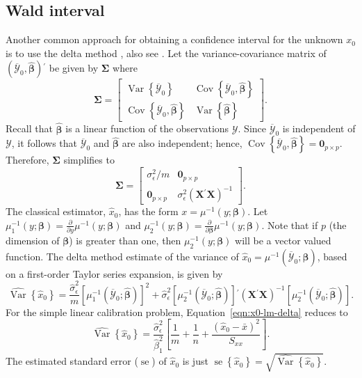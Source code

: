 \documentclass[cmfont,usenames,dvipsnames,leqno]{afit-etd}\usepackage[]{graphicx}\usepackage[]{color}
\newcommand{\trans}{\ensuremath{^\prime}}
\newcommand{\bc}[1]{\ensuremath{\bm{\mathcal{#1}}}}
\newcommand{\mc}[1]{\ensuremath{\mathcal{#1}}}
\newcommand{\wh}[1]{\ensuremath{\widehat{#1}}}
\newcommand{\wb}[1]{\ensuremath{\overline{#1}}}
\newcommand{\var}{\operatorname{Var}}
\newcommand{\cov}{\operatorname{Cov}}
\newcommand{\se}{\operatorname{se}}
\newcommand{\X}{\ensuremath{\bm{X}}}
\begin{document}
\subsection{Wald interval}
\label{sec:wald_int}
Another common approach for obtaining a confidence interval for the unknown $x_0$ is to use the delta method \citep{verhoef_who_2012, dorfman_note_1938}, also see \citet{casella_statistical_2002}. Let the variance-covariance matrix of $\left(\wb{\mc{Y}}_0, \wh{\bm{\beta}}\right)\trans$ be given by $\bm{\Sigma}$ where
\begin{equation*}
  \bm{\Sigma} = 
    \begin{bmatrix}
      \var\left\{\wb{\mc{Y}}_0\right\} & \cov\left\{\wb{\mc{Y}}_0, \wh{\bm{\beta}}\right\} \\
      \cov\left\{\wb{\mc{Y}}_0, \wh{\bm{\beta}}\right\} & \var\left\{\wh{\bm{\beta}}\right\}
    \end{bmatrix}.
\end{equation*}
Recall that $\wh{\bm{\beta}}$ is a linear function of the observations $\bc{Y}$. Since $\wb{\mc{Y}}_0$ is independent of $\bc{Y}$, it follows that $\wb{\mc{Y}}_0$ and $\wh{\bm{\beta}}$ are also independent; hence, $\cov\left\{\wb{\mc{Y}}_0, \wh{\bm{\beta}}\right\} = \bm{0}_{p \times p}$. Therefore, $\bm{\Sigma}$ simplifies to
\begin{equation*}
  \bm{\Sigma} = 
    \begin{bmatrix}
      \sigma_\epsilon^2/m & \bm{0}_{p \times p} \\
      \bm{0}_{p \times p} & \sigma_\epsilon^2\left(\X\trans\X\right)^{-1}
    \end{bmatrix}.
\end{equation*}
The classical estimator, $\wh{x}_0$, has the form $x = \mu^{-1}\left(y; \bm{\beta}\right)$. Let $\mu_1^{-1}\left(y; \bm{\beta}\right) = \frac{\partial}{\partial y}\mu^{-1}\left(y; \bm{\beta}\right)$ and $\mu_2^{-1}\left(y; \bm{\beta}\right) = \frac{\partial}{\partial \bm{\beta}}\mu^{-1}\left(y; \bm{\beta}\right)$. Note that if $p$ (the dimension of $\bm{\beta}$) is greater than one, then $\mu_2^{-1}\left(y; \bm{\beta}\right)$ will be a vector valued function. The delta method estimate of the variance of $\wh{x}_0 = \mu^{-1}\left(\wb{\mc{Y}}_0; \wh{\bm{\beta}}\right)$, based on a first-order Taylor series expansion, is given by
\begin{equation}
  \label{eqn:x0-lm-delta}
  \wh{\var}\left\{\wh{x}_0\right\} = \frac{\wh{\sigma}_\epsilon^2}{m}\left[\mu_1^{-1}\left(\wb{\mc{Y}}_0; \wh{\bm{\beta}}\right)\right]^2 + \wh{\sigma}_\epsilon^2\left[\mu_2^{-1}\left(\wb{\mc{Y}}_0; \wh{\bm{\beta}}\right)\right]\trans\left(\X\trans\X\right)^{-1}\left[\mu_2^{-1}\left(\wb{\mc{Y}}_0; \wh{\bm{\beta}}\right)\right].
\end{equation}
For the simple linear calibration problem, Equation~\eqref{eqn:x0-lm-delta} reduces to
\begin{equation*}
  \wh{\var}\left\{\wh{x}_0\right\} = \frac{\wh{\sigma}_\epsilon^2}{\wh{\beta}_1^2}\left[\frac{1}{m}+\frac{1}{n}+\frac{(\wh{x}_0-\bar{x})^2}{S_{xx}}\right]. 
\end{equation*}
The estimated standard error ($\se$) of $\wh{x}_0$ is just $\se\left\{\wh{x}_0\right\} = \sqrt{\wh{\var}\left\{\wh{x}_0\right\}}$.
\end{document}
